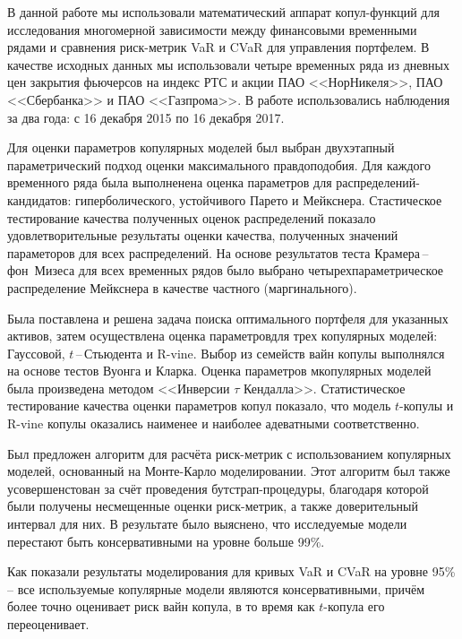 
В данной работе мы использовали математический аппарат копул-функций для исследования многомерной зависимости между финансовыми временными рядами и сравнения риск-метрик VaR и CVaR для управления портфелем.
В качестве исходных данных мы использовали четыре временных ряда из дневных цен закрытия фьючерсов на индекс РТС и акции ПАО <<НорНикеля>>, ПАО <<Сбербанка>> и ПАО <<Газпрома>>.
В работе использовались наблюдения за два года: с 16 декабря 2015 по 16 декабря 2017.

Для оценки параметров копулярных моделей был выбран двухэтапный параметрический подход оценки максимального правдоподобия.
Для каждого временного ряда была выполненена оценка параметров для распределений-кандидатов: гиперболического, устойчивого Парето и Мейкснера.
Стастическое тестирование качества полученных оценок распределений показало удовлетворительные результаты оценки качества, полученных значений параметоров для всех распределений.
На основе результатов теста Крамера\,--\,фон~Мизеса для всех временных рядов было выбрано четырехпараметрическое распределение Мейкснера в качестве частного (маргинального).

Была поставлена и решена задача поиска оптимального портфеля  для указанных активов, затем осуществлена оценка параметровдля трех копулярных моделей: Гауссовой, $t$\,--\,Стьюдента и R-vine.
Выбор из семейств вайн копулы выполнялся на основе тестов Вуонга и Кларка.
Оценка параметров мкопулярных моделей была произведена методом <<Инверсии $\tau$ Кендалла>>.
Статистическое тестирование качества оценки параметров копул показало, что модель $t$-копулы и R-vine копулы оказались наименее и наиболее адеватными соответственно.

Был предложен алгоритм для расчёта риск-метрик с использованием копулярных моделей, основанный на Монте-Карло моделировании.
Этот алгоритм был также усовершенстован за счёт проведения бутстрап-процедуры, благодаря которой были получены несмещенные оценки риск-метрик, а также доверительный интервал для них.
В результате было выяснено, что исследуемые модели перестают быть консервативными на уровне больше 99\%.

Как показали результаты моделирования для кривых VaR и CVaR на уровне 95\% -- все используемые копулярные модели являются консервативными, причём более точно оценивает риск вайн копула, в то время как $t$-копула его переоценивает.
